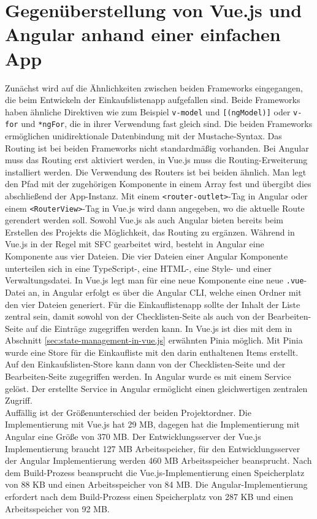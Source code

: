 \section{Gegenüberstellung von Vue.js und Angular anhand einer einfachen App}
Zunächst wird auf die Ähnlichkeiten zwischen beiden Frameworks eingegangen, die beim Entwickeln der Einkaufslistenapp aufgefallen sind.
Beide Frameworks haben ähnliche Direktiven wie zum Beispiel \texttt{v-model} und \texttt{[(ngModel)]} oder \texttt{v-for} und \texttt{*ngFor},
die in ihrer Verwendung fast gleich sind.
Die beiden Frameworks ermöglichen unidirektionale Datenbindung mit der Mustache-Syntax.
Das Routing ist bei beiden Frameworks nicht standardmäßig vorhanden.
Bei Angular muss das Routing erst aktiviert werden, in Vue.js muss die Routing-Erweiterung installiert werden.
Die Verwendung des Routers ist bei beiden ähnlich.
Man legt den Pfad mit der zugehörigen Komponente in einem Array fest
und übergibt dies abschließend der App-Instanz.
Mit einem \texttt{<router-outlet>}-Tag in Angular oder einem \texttt{<RouterView>}-Tag in Vue.js wird dann angegeben, wo die aktuelle Route gerendert werden soll.
Sowohl Vue.js als auch Angular bieten bereits beim Erstellen des Projekts die Möglichkeit, das Routing zu ergänzen.
Während in Vue.js in der Regel mit SFC gearbeitet wird, besteht in Angular eine Komponente aus vier Dateien.
Die vier Dateien einer Angular Komponente unterteilen sich in eine TypeScript-, eine HTML-, eine Style- und einer Verwaltungsdatei.
In Vue.js legt man für eine neue Komponente eine neue \texttt{.vue}-Datei an,
in Angular erfolgt es über die Angular CLI, welche einen Ordner mit den vier Dateien generiert.
Für die Einkauflistenapp sollte der Inhalt der Liste zentral sein, damit sowohl von der Checklisten-Seite als auch von der Bearbeiten-Seite
auf die Einträge zugegriffen werden kann.
In Vue.js ist dies mit dem in Abschnitt \ref{sec:state-management-in-vue.js} erwähnten Pinia möglich.
Mit Pinia wurde eine Store für die Einkaufliste mit den darin enthaltenen Items erstellt.
Auf den Einkaufslisten-Store kann dann von der Checklisten-Seite und der Bearbeiten-Seite zugegriffen werden.
In Angular wurde es mit einem Service gelöst.
Der erstellte Service in Angular ermöglicht einen gleichwertigen zentralen Zugriff.
\\
Auffällig ist der Größenunterschied der beiden Projektordner.
Die Implementierung mit Vue.js hat 29 MB, dagegen hat die Implementierung mit Angular eine Größe von 370 MB.
Der Entwicklungsserver der Vue.js Implementierung braucht 127 MB Arbeitsspeicher, für den Entwicklungsserver der Angular Implementierung
werden 460 MB Arbeitsspeicher beansprucht.
Nach dem Build-Prozess beansprucht die Vue.js-Implementierung einen Speicherplatz von 88 KB und einen Arbeitsspeicher von 84 MB.
Die Angular-Implementierung erfordert nach dem Build-Prozess einen Speicherplatz von 287 KB und einen Arbeitsspeicher von 92 MB.




